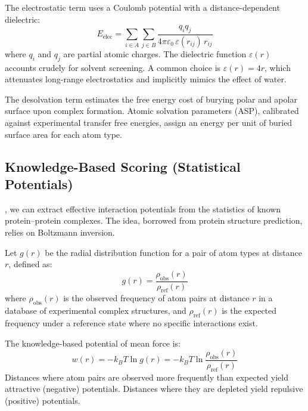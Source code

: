 The electrostatic term uses a Coulomb potential with a distance-dependent dielectric:
\begin{equation}
\label{eq:elec}
E_\text{elec} = \sum_{i \in A}\sum_{j \in B} \frac{q_i q_j}{4\pi\varepsilon_0\,\varepsilon(r_{ij})\,r_{ij}}
\end{equation}
where $q_i$ and $q_j$ are partial atomic charges.
The dielectric function $\varepsilon(r)$ accounts crudely for solvent screening.
A common choice is $\varepsilon(r) = 4r$, which attenuates long-range electrostatics and implicitly mimics the effect of water.

The desolvation term estimates the free energy cost of burying polar and apolar surface upon complex formation.
Atomic solvation parameters (ASP), calibrated against experimental transfer free energies, assign an energy per unit of buried surface area for each atom type.

\subsection{Knowledge-Based Scoring (Statistical Potentials)}

, we can extract effective interaction potentials from the statistics of known protein--protein complexes.
The idea, borrowed from protein structure prediction, relies on Boltzmann inversion.

Let $g(r)$ be the radial distribution function for a pair of atom types at distance $r$, defined as:
\begin{equation}
\label{eq:rdf}
g(r) = \frac{\rho_\text{obs}(r)}{\rho_\text{ref}(r)}
\end{equation}
where $\rho_\text{obs}(r)$ is the observed frequency of atom pairs at distance $r$ in a database of experimental complex structures, and $\rho_\text{ref}(r)$ is the expected frequency under a reference state where no specific interactions exist.

The knowledge-based potential of mean force is:
\begin{equation}
\label{eq:kb-potential}
w(r) = -k_BT \ln g(r) = -k_BT \ln \frac{\rho_\text{obs}(r)}{\rho_\text{ref}(r)}
\end{equation}
Distances where atom pairs are observed more frequently than expected yield attractive (negative) potentials.
Distances where they are depleted yield repulsive (positive) potentials.

